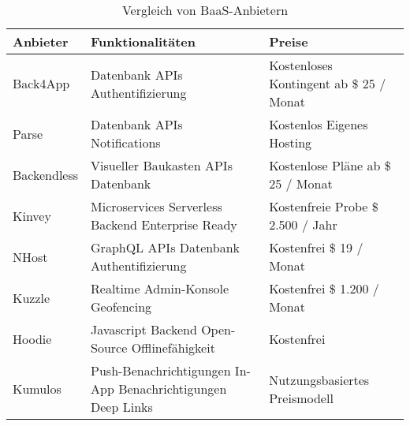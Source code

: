\begin{itemize}
\begin{itemize}
\begin{table}[h]
  \caption{Vergleich von \ac{BaaS}-Anbietern \autocite{mbaasComparison}}
  \label{Kap2:BaasAnbieter}
  \renewcommand{\arraystretch}{1.2}
  \centering
  \sffamily
  \begin{footnotesize}
    \begin{tabularx}{\textwidth}{l X X}
    \toprule
    \textbf{Anbieter} & \textbf{Funktionalitäten} & \textbf{Preise} \\
    \midrule
      Back4App & Datenbank \newline \acs{API}s \newline Authentifizierung & Kostenloses Kontingent \newline ab \$ 25 / Monat \\
      Parse & Datenbank \newline \acs{API}s \newline Notifications & Kostenlos \newline Eigenes Hosting \\
      Backendless & Visueller Baukasten \newline \acs{API}s \newline Datenbank & Kostenlose Pläne \newline ab \$ 25 / Monat \\
      Kinvey & Microservices \newline Serverless Backend \newline Enterprise Ready & Kostenfreie Probe \newline \$ 2.500 / Jahr \\
      NHost & GraphQL \acs{API}s \newline Datenbank \newline Authentifizierung & Kostenfrei \newline \$ 19 / Monat \\
      Kuzzle & Realtime \newline Admin-Konsole \newline Geofencing & Kostenfrei \newline \$ 1.200 / Monat \\
      Hoodie & Javascript Backend \newline Open-Source \newline Offlinefähigkeit & Kostenfrei \\
      Kumulos & Push-Benachrichtigungen \newline In-App Benachrichtigungen \newline Deep Links & Nutzungsbasiertes Preismodell \\

\end{tabularx}
\end{footnotesize}
\end{table}
\end{itemize}
\end{itemize}
